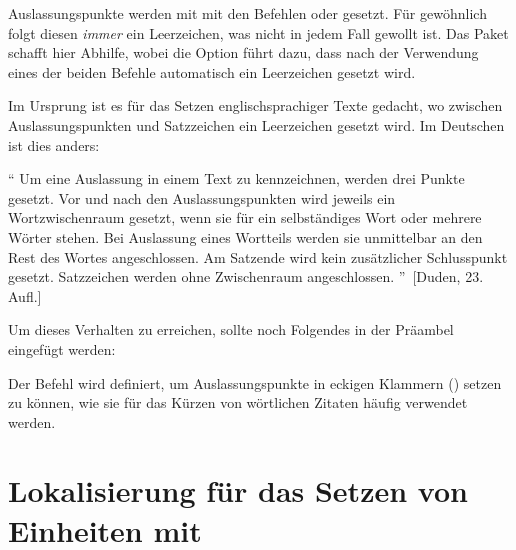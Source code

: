 %
Auslassungspunkte werden mit  mit den Befehlen  oder 
 gesetzt. Für gewöhnlich folgt diesen \emph{immer} ein 
Leerzeichen, was nicht in jedem Fall gewollt ist. Das Paket  
schafft hier Abhilfe, wobei die Option  führt dazu, dass nach 
der Verwendung eines der beiden Befehle automatisch ein Leerzeichen gesetzt 
wird. 
%
\begin{quoting}
\begin{Code}
\usepackage[xspace]{ellipsis}
\end{Code}
\end{quoting}
%
Im Ursprung ist es für das Setzen englischsprachiger Texte gedacht, wo zwischen 
Auslassungspunkten und Satzzeichen ein Leerzeichen gesetzt wird. Im Deutschen 
ist dies anders:
%
\begin{quoting}
\enquote{%
  Um eine Auslassung in einem Text zu kennzeichnen, werden drei Punkte gesetzt. 
  Vor und nach den Auslassungspunkten wird jeweils ein Wortzwischenraum 
  gesetzt, wenn sie für ein selbständiges Wort oder mehrere Wörter stehen. Bei 
  Auslassung eines Wortteils werden sie unmittelbar an den Rest des Wortes 
  angeschlossen. Am Satzende wird kein zusätzlicher Schlusspunkt gesetzt. 
  Satzzeichen werden ohne Zwischenraum angeschlossen.%
}~[Duden, 23. Aufl.]
\end{quoting} 
%
Um dieses Verhalten zu erreichen, sollte noch Folgendes in der Präambel 
eingefügt werden:
%
\begin{quoting}
\begin{Code}
\let\ellipsispunctuation\relax
\newcommand*{\qdots}{[\dots{}]\xspace}
\end{Code}
\end{quoting}
%
Der Befehl  wird definiert, um Auslassungspunkte in eckigen 
Klammern (\OPValue{\dots}) setzen zu können, wie sie für das Kürzen von 
wörtlichen Zitaten häufig verwendet werden.



\section{%
  Lokalisierung für das Setzen von Einheiten mit %
  \label{sec:tips:siunitx}%
}

